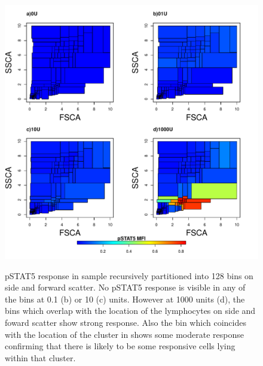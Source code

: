 %
\begin{figure}
 \centering
\begin{minipage}{.65\textwidth}
\includegraphics[width=\linewidth]{figures/scatter-rpart-128bin-var-pstat5}
\end{minipage}
\begin{minipage}{.3\textwidth}
{pSTAT5 response in sample recursively partitioned into 128 bins on side and forward scatter.}
{
  No pSTAT5 response is visible in any of the bins at 0.1 (b) or 10 (c) units.
  However at 1000 units (d), the bins which overlap with the location of the lymphocytes on side and foward scatter show strong response.
  Also the bin which coincides with the location of the cluster in  shows some moderate response
  confirming that there is likely to be some responsive cells lying within that cluster.
}
\end{minipage}
\end{figure}


